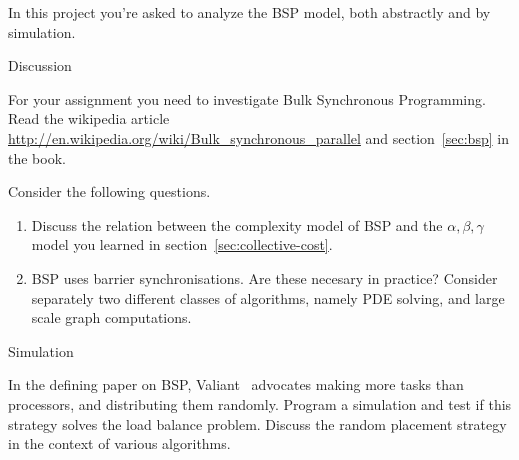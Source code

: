In this project you're asked to analyze the \acf{BSP} model, both
abstractly and by simulation.

 {Discussion}

For your assignment you need to investigate Bulk Synchronous
Programming. Read the wikipedia article
\url{http://en.wikipedia.org/wiki/Bulk_synchronous_parallel} and
section~\ref{sec:bsp} in the book.  

Consider the following questions.

\begin{enumerate}
\item Discuss the relation between the complexity model of BSP and the
  $\alpha,\beta,\gamma$ model you learned in
  section~\ref{sec:collective-cost}.
\item \ac{BSP} uses barrier synchronisations. Are these necesary in
  practice? Consider separately two different classes of algorithms, namely
  \ac{PDE} solving, and large scale graph computations.
\end{enumerate}

 {Simulation}

In the defining paper on \ac{BSP}, Valiant~\cite{Valiant:1990:BSP}
advocates making more tasks than processors, and distributing them
randomly. Program a simulation and test if this strategy solves the
load balance problem. Discuss the random placement strategy in the
context of various algorithms.

